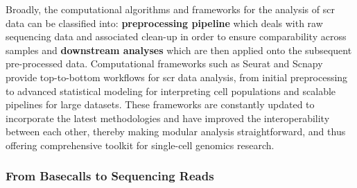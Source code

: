 \vspace{3mm}

\par Broadly, the computational algorithms and frameworks for the analysis of \gls{scr} data can be classified into: \textbf{preprocessing pipeline} which deals with raw sequencing data and associated clean-up in order to ensure comparability across samples and \textbf{downstream analyses} which are then applied onto the subsequent pre-processed data. Computational frameworks such as Seurat \textbf{\cite{butler_integrating_2018,stuart_comprehensive_2019,hao_integrated_2021}} and Scnapy \textbf{\cite{wolf_scanpy_2018}} provide top-to-bottom workflows for \gls{scr} data analysis, from initial preprocessing to advanced statistical modeling for interpreting cell populations and scalable pipelines for large datasets. These frameworks are constantly updated to incorporate the latest methodologies and have improved the interoperability between each other, thereby making modular analysis straightforward, and thus offering comprehensive toolkit for single-cell genomics research. 

\subsubsection{From Basecalls to Sequencing Reads}



